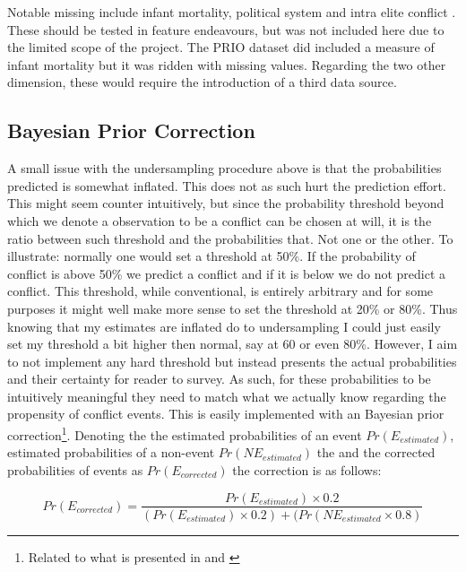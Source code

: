 \documentclass[a4paper]{article}
\begin{document}
Notable missing include infant mortality, political system and intra elite conflict \citep{Goldstone_2010}. These should be tested in feature endeavours, but was not included here due to the limited scope of the project. The PRIO dataset did included a measure of infant mortality but it was ridden with missing values. Regarding the two other dimension, these would require the introduction of a third data source.\par

\subsection{Bayesian Prior Correction}\label{bayes_correction}

A small issue with the undersampling procedure above is that the probabilities predicted is somewhat inflated. This does not as such hurt the prediction effort. This might seem counter intuitively, but since the probability threshold beyond which we denote a observation to be a conflict can be chosen at will, it is the ratio between such threshold and the probabilities that. Not one or the other. To illustrate: normally one would set a threshold at 50\%. If the probability of conflict is above 50\% we predict a conflict and if it is below we do not predict a conflict. This threshold, while conventional, is entirely arbitrary and for some purposes it might well make more sense to set the threshold at 20\% or 80\%. Thus knowing that my estimates are inflated do to undersampling I could just easily set my threshold a bit higher then normal, say at 60 or even 80\%. However, I aim to not implement any hard threshold but instead presents the actual probabilities and their certainty for reader to survey. As such, for these probabilities to be intuitively meaningful they need to match what we actually know regarding the propensity of conflict events. This is easily implemented with an Bayesian prior correction\footnote{Related to what is presented in \cite{King_Zeng_2001, king_zeng_2001b} and \cite{Goldstone_2010}}. Denoting the the estimated probabilities of an event $Pr(E_{estimated})$, estimated probabilities of a non-event $Pr(NE_{estimated})$ the  and the corrected probabilities of events as $Pr(E_{corrected})$ the correction is as follows:

\[
Pr(E_{corrected}) = \frac{Pr(E_{estimated}) \times 0.2}{(Pr(E_{estimated}) \times 0.2)+(Pr(NE_{estimated} \times 0.8)} \tag{1} \label{eq:bayes}
\]
\end{document}
